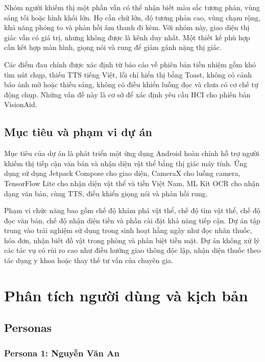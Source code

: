 \documentclass[a4paper,13pt]{report}
\begin{document}
Nhóm người khiếm thị một phần vẫn có thể nhận biết màu sắc tương phản, vùng sáng tối hoặc hình khối lớn. Họ cần chữ lớn, độ tương phản cao, vùng chạm rộng, khả năng phóng to và phản hồi âm thanh đi kèm. Với nhóm này, giao diện thị giác vẫn có giá trị, nhưng không được là kênh duy nhất. Một thiết kế phù hợp cần kết hợp màn hình, giọng nói và rung để giảm gánh nặng thị giác.

Các điểm đau chính được xác định từ báo cáo về phiên bản tiền nhiệm gồm khó tìm nút chụp, thiếu TTS tiếng Việt, lỗi chỉ hiển thị bằng Toast, không có cảnh báo ảnh mờ hoặc thiếu sáng, không có điều khiển luồng đọc và chưa có cơ chế tự động chụp. Những vấn đề này là cơ sở để xác định yêu cầu HCI cho phiên bản VisionAid.

\section{Mục tiêu và phạm vi dự án}

Mục tiêu của dự án là phát triển một ứng dụng Android hoàn chỉnh hỗ trợ người khiếm thị tiếp cận văn bản và nhận diện vật thể bằng thị giác máy tính. Ứng dụng sử dụng Jetpack Compose cho giao diện, CameraX cho luồng camera, TensorFlow Lite cho nhận diện vật thể và tiền Việt Nam, ML Kit OCR cho nhận dạng văn bản, cùng TTS, điều khiển giọng nói và phản hồi rung.

Phạm vi chức năng bao gồm chế độ khám phá vật thể, chế độ tìm vật thể, chế độ đọc văn bản, chế độ nhận diện tiền và phần cài đặt khả năng tiếp cận. Dự án tập trung vào trải nghiệm sử dụng trong sinh hoạt hằng ngày như đọc nhãn thuốc, hóa đơn, nhận biết đồ vật trong phòng và phân biệt tiền mặt. Dự án không xử lý các tác vụ có rủi ro cao như điều hướng giao thông độc lập, nhận diện thuốc theo tác dụng y khoa hoặc thay thế tư vấn của chuyên gia.

\chapter{Phân tích người dùng và kịch bản}

\section{Personas}

\subsection{Persona 1: Nguyễn Văn An}
\end{document}
